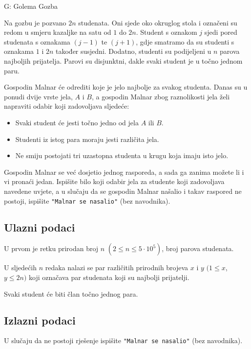 \begin{statement}[
  timelimit=2 s,
  memorylimit=512 MiB,
]{G: Golema Gozba}

Na gozbu je pozvano $2n$ studenata. Oni sjede oko okruglog stola i označeni su
redom u smjeru kazaljke na satu od $1$ do $2n$. Student s oznakom $j$ sjedi
pored studenata s oznakama $(j - 1)$ te $(j + 1)$, gdje smatramo da su studenti
s oznakama $1$ i $2n$ također susjedni. Dodatno, studenti su podijeljeni u $n$
parova najboljih prijatelja. Parovi su disjunktni, dakle svaki student je u
točno jednom paru.

Gospodin Malnar će odrediti koje je jelo najbolje za svakog studenta. Danas su
u ponudi dvije vrste jela, $A$ i $B$, a gospodin Malnar zbog raznolikosti jela
želi napraviti odabir koji zadovoljava sljedeće:
\begin{itemize}
    \item Svaki student će jesti točno jedno od jela $A$ ili $B$.
    \item Studenti iz istog para moraju jesti različita jela.
    \item Ne smiju postojati tri uzastopna studenta u krugu koja imaju isto jelo.
\end{itemize}

Gospodin Malnar se već dosjetio jednog rasporeda, a sada ga zanima možete li i
vi pronaći jedan. Ispišite bilo koji odabir jela za studente koji zadovoljava
navedene uvjete, a u slučaju da se gospodin Malnar našalio i takav raspored ne
postoji, ispišite \texttt{"Malnar se nasalio"} (bez navodnika).

\subsection*{Ulazni podaci}
U prvom je retku prirodan broj $n$ $(2 \le n \le 5 \cdot 10^5)$, broj parova
studenata.

U sljedećih $n$ redaka nalazi se par različitih prirodnih brojeva $x$ i $y$
$(1 \le x$, $y \le 2n)$ koji označava par studenata koji su najbolji prijatelji.

Svaki student će biti član točno jednog para.
\subsection*{Izlazni podaci}
U slučaju da ne postoji rješenje ispišite \texttt{"Malnar se nasalio"}
(bez navodnika).


\end{statement}
